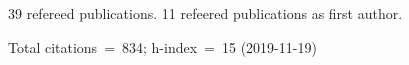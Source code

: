39 refereed publications. 11 refeered publications as first author.

Total citations~=~834; h-index~=~15 (2019-11-19)